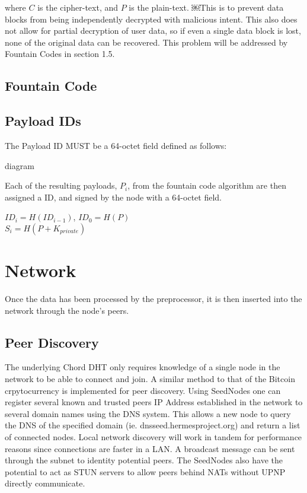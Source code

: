 \documentclass[journal]{IEEEtran}
\begin{document}
\noindent
where $C$ is the cipher-text, and $P$ is the plain-text. ￼This is to prevent data blocks from being independently decrypted with malicious intent. This also does not allow for partial decryption of user data, so if even a single data block is lost, none of the original data can be recovered. This problem will be addressed by Fountain Codes in section 1.5.

\subsection{Fountain Code}


\subsection{Payload IDs}
The Payload ID MUST be a 64-octet field defined as follows:

diagram

Each of the resulting payloads, $P_i$, from the fountain code algorithm are then assigned a ID, and signed by the node with a 64-octet field.

\begin{center}
$ID_i = H(ID_{i-1})$, $ID_0 = H(P)$\\
$S_i = H(P + K_{private})$
\end{center}

\section{Network}
Once the data has been processed by the preprocessor, it is then inserted into the network through the node's peers.

\subsection{Peer Discovery} %
The underlying Chord DHT only requires knowledge of a single node in the network to be able to connect and join. A similar method to that of the Bitcoin crpytocurrency is implemented for peer discovery. Using SeedNodes one can register several known and trusted peers IP Address established in the network to several domain names using the DNS system. This allows a new node to query the DNS of the specified domain (ie. dnsseed.hermesproject.org) and return a list of connected nodes. Local network discovery will work in tandem for performance reasons since connections are faster in a LAN. A broadcast message can be sent through the subnet to identity potential peers. The SeedNodes also have the potential to act as STUN servers to allow peers behind NATs without UPNP directly communicate.
\end{document}
